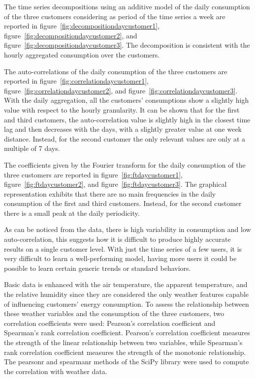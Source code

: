 The time series decompositions using an additive model of the daily consumption of the three customers considering as period of the time series a week are reported in figure~\ref{fig:decompositiondaycustomer1}, figure~\ref{fig:decompositiondaycustomer2}, and figure~\ref{fig:decompositiondaycustomer3}.
The decomposition is consistent with the hourly aggregated consumption over the customers.

The auto-correlations of the daily consumption of the three customers are reported in figure~\ref{fig:correlationdaycustomer1},  figure~\ref{fig:correlationdaycustomer2}, and  figure~\ref{fig:correlationdaycustomer3}.
With the daily aggregation, all the customers’ consumptions show a slightly high value with respect to the hourly granularity.
It can be shown that for the first and third customers, the auto-correlation value is slightly high in the closest time lag and then decreases with the days, with a slightly greater value at one week distance.
Instead, for the second customer the only relevant values are only at a multiple of 7 days.

The coefficients given by the Fourier transform for the daily consumption of the three customers are reported in figure~\ref{fig:ftdaycustomer1}, figure~\ref{fig:ftdaycustomer2}, and figure~\ref{fig:ftdaycustomer3}.
The graphical representation exhibits that there are no main frequencies in the daily consumption of the first and third customers.
Instead, for the second customer there is a small peak at the daily periodicity.

As can be noticed from the data, there is high variability in consumption and low auto-correlation, this suggests how it is difficult to produce highly accurate results on a single customer level.
With just the time series of a few users, it is very difficult to learn a well-performing model, having more users it could be possible to learn certain generic trends or standard behaviors.

Basic data is enhanced with the air temperature, the apparent temperature, and the relative humidity since they are considered the only weather features capable of influencing customers' energy consumption.
To assess the relationship between these weather variables and the consumption of the three customers, two correlation coefficients were used: Pearson's correlation coefficient and Spearman's rank correlation coefficient.
Pearson's correlation coefficient measures the strength of the linear relationship between two variables, while Spearman's rank correlation coefficient measures the strength of the monotonic relationship.
The pearsonr and spearmanr methods of the SciPy library were used to compute the correlation with weather data.


